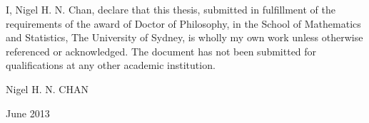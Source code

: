 
\begin{declaration} %
I, Nigel H. N. Chan, declare that this thesis, submitted in fulfillment of the requirements of the award of Doctor of Philosophy, in the School of Mathematics and Statistics, The University of Sydney, is wholly my own work unless otherwise referenced or acknowledged. The document has not been submitted for qualifications at any other academic institution. 

\vskip 2cm
\hfill Nigel H. N. CHAN

\hfill June 2013
\end{declaration}


